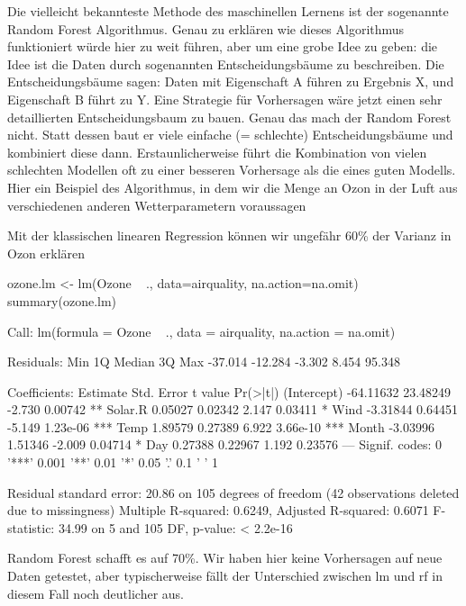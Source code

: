 \documentclass[a4paper,twoside]{tufte-book}\usepackage[]{graphicx}\usepackage[]{color}
\begin{document}
Die vielleicht bekannteste Methode des maschinellen Lernens ist der sogenannte Random Forest Algorithmus. Genau zu erklären wie dieses Algorithmus funktioniert würde hier zu weit führen, aber um eine grobe Idee zu geben: die Idee ist die Daten durch sogenannten Entscheidungsbäume zu beschreiben. Die Entscheidungsbäume sagen: Daten mit Eigenschaft A führen zu Ergebnis X, und Eigenschaft B führt zu Y. Eine Strategie für Vorhersagen wäre jetzt einen sehr detaillierten Entscheidungsbaum zu bauen. Genau das mach der Random Forest nicht. Statt dessen baut er viele einfache (= schlechte) Entscheidungsbäume und kombiniert diese dann. Erstaunlicherweise führt die Kombination von vielen schlechten Modellen oft zu einer besseren Vorhersage als die eines guten Modells. Hier ein Beispiel des Algorithmus, in dem wir die Menge an Ozon in der Luft aus verschiedenen anderen Wetterparametern voraussagen 

Mit der klassischen linearen Regression können wir ungefähr 60\% der Varianz in Ozon erklären

\begin{Schunk}
\begin{Sinput}
ozone.lm <- lm(Ozone ~ ., data=airquality, na.action=na.omit)
summary(ozone.lm)
\end{Sinput}
\begin{Soutput}

Call:
lm(formula = Ozone ~ ., data = airquality, na.action = na.omit)

Residuals:
    Min      1Q  Median      3Q     Max 
-37.014 -12.284  -3.302   8.454  95.348 

Coefficients:
             Estimate Std. Error t value Pr(>|t|)    
(Intercept) -64.11632   23.48249  -2.730  0.00742 ** 
Solar.R       0.05027    0.02342   2.147  0.03411 *  
Wind         -3.31844    0.64451  -5.149 1.23e-06 ***
Temp          1.89579    0.27389   6.922 3.66e-10 ***
Month        -3.03996    1.51346  -2.009  0.04714 *  
Day           0.27388    0.22967   1.192  0.23576    
---
Signif. codes:  0 '***' 0.001 '**' 0.01 '*' 0.05 '.' 0.1 ' ' 1

Residual standard error: 20.86 on 105 degrees of freedom
  (42 observations deleted due to missingness)
Multiple R-squared:  0.6249,	Adjusted R-squared:  0.6071 
F-statistic: 34.99 on 5 and 105 DF,  p-value: < 2.2e-16
\end{Soutput}
\end{Schunk}

Random Forest schafft es auf 70\%. Wir haben hier keine Vorhersagen auf neue Daten getestet, aber typischerweise fällt der Unterschied zwischen lm und rf in diesem Fall noch deutlicher aus. 
\end{document}
